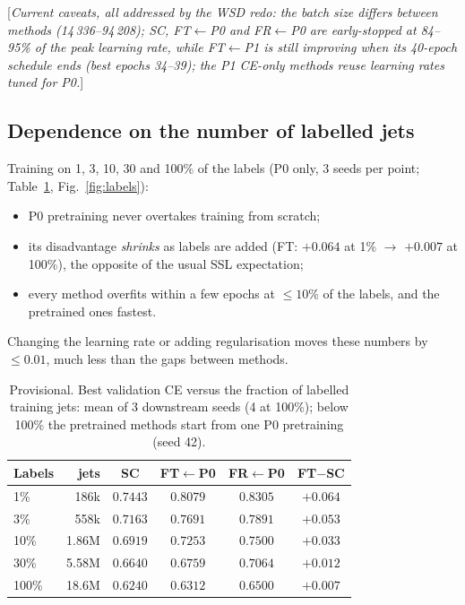 \documentclass[11pt,a4paper]{article}
\newcommand{\note}[1]{\textcolor{blue!70!black}{[\emph{#1}]}}
\newcommand{\prov}[1]{\textcolor{orange!85!black}{#1}}
\newcommand{\from}[2]{#1$\leftarrow$#2}
\begin{document}
\note{Current caveats, all addressed by the WSD redo: the batch size differs between
methods (14\,336--94\,208); SC, \from{FT}{P0} and \from{FR}{P0} are early-stopped at
84--95\% of the peak learning rate, while \from{FT}{P1} is still improving when its
40-epoch schedule ends (best epochs 34--39); the P1 CE-only methods reuse learning rates
tuned for P0.}

\subsection{Dependence on the number of labelled jets}
Training on 1, 3, 10, 30 and 100\% of the labels (P0 only, 3 seeds per point;
Table~\ref{tab:labels}, Fig.~\ref{fig:labels}):
\begin{itemize}
  \item P0 pretraining never overtakes training from scratch;
  \item its disadvantage \emph{shrinks} as labels are added (FT: $+0.064$ at 1\% $\to$
        $+0.007$ at 100\%), the opposite of the usual SSL expectation;
  \item every method overfits within a few epochs at $\le10\%$ of the labels, and the
        pretrained ones fastest.
\end{itemize}
Changing the learning rate or adding regularisation moves these numbers by $\le0.01$, much
less than the gaps between methods.

\begin{table}[htbp]
\centering\small
\caption{\prov{Provisional.} Best validation CE versus the fraction of labelled training
jets: mean of 3 downstream seeds (4 at 100\%); below 100\% the pretrained methods start
from one P0 pretraining (seed 42).}
\label{tab:labels}
\begin{tabular}{lrcccc}
\toprule
Labels & jets & SC & \from{FT}{P0} & \from{FR}{P0} & FT$-$SC \\
\midrule
1\%   & 186k  & \prov{$0.7443$} & \prov{$0.8079$} & \prov{$0.8305$} & \prov{$+0.064$} \\
3\%   & 558k  & \prov{$0.7163$} & \prov{$0.7691$} & \prov{$0.7891$} & \prov{$+0.053$} \\
10\%  & 1.86M & \prov{$0.6919$} & \prov{$0.7253$} & \prov{$0.7500$} & \prov{$+0.033$} \\
30\%  & 5.58M & \prov{$0.6640$} & \prov{$0.6759$} & \prov{$0.7064$} & \prov{$+0.012$} \\
100\% & 18.6M & \prov{$0.6240$} & \prov{$0.6312$} & \prov{$0.6500$} & \prov{$+0.007$} \\
\bottomrule
\end{tabular}
\end{table}
\end{document}

